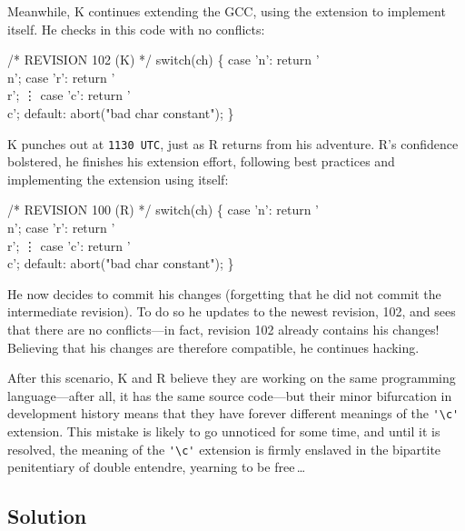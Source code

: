 \documentclass[twocolumn]{article}
\begin{document}
Meanwhile, K continues extending the GCC, using the extension to
implement itself. He checks in this code with no conflicts:
%
\begin{code}
/* REVISION 102 (K) */
switch(ch) \{
  case 'n': return '\\n';
  case 'r': return '\\r';
  \vdots
  case 'c': return '\\c';
  default: abort("bad char constant");
\}
\end{code}
%
K punches out at {\tt 1130 UTC},\z{}
just as R returns from his adventure. R's confidence bolstered, he
finishes his extension effort, following best practices and
implementing the extension using itself:
%
\begin{code}
/* REVISION 100 (R) */
switch(ch) \{
  case 'n': return '\\n';
  case 'r': return '\\r';
  \vdots
  case 'c': return '\\c';
  default: abort("bad char constant");
\}
\end{code}
%
He now decides to commit his changes (forgetting that he did not
commit the intermediate revision). To do so he updates to the newest
revision, 102, and sees that there are no conflicts---in fact,
revision 102 already contains his changes! Believing that his changes
are therefore compatible, he continues hacking.

After this scenario, K and R believe they are working on the same
programming language---after all, it has the same source code---but
their minor bifurcation in development history means that they have
forever different meanings of the \verb+'\c'+ extension. This mistake
is likely to go unnoticed for some time, and until it is resolved, the
meaning of the \verb+'\c'+ extension is firmly enslaved in the
bipartite penitentiary of double entendre, yearning to be
free\,\ldots\z{}

\vspace{10em}
\subsection{Solution}
\end{document}
